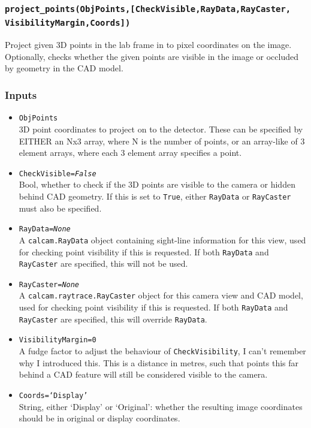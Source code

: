 \documentclass[12pt]{article}
\newcommand{\code}[1]{\texttt{#1}}
\begin{document}
\subsubsection*{\code{project\_points(ObjPoints,[CheckVisible,RayData,RayCaster,\\VisibilityMargin,Coords])}}
\begin{adjustwidth}{0.5cm}{0cm}
Project given 3D points in the lab frame in to pixel coordinates on the image. Optionally, checks whether the given points are visible in the image or occluded by geometry in the CAD model.
\subsubsection*{Inputs}
\begin{itemize}
\item{\code{ObjPoints}\\3D point coordinates to project on to the detector. These can be specified by EITHER an Nx3 array, where N is the number of points, or an array-like of 3 element arrays, where each 3 element array specifies a point.}
\item{\code{CheckVisible={\it False}}\\Bool, whether to check if the 3D points are visible to the camera or hidden behind CAD geometry. If this is set to \code{True}, either \code{RayData} or \code{RayCaster} must also be specified.}
\item{\code{RayData={\it None}}\\A \code{calcam.RayData} object containing sight-line information for this view, used for checking point visibility if this is requested. If both \code{RayData} and \code{RayCaster} are specified, this will not be used.}
\item{\code{RayCaster={\it None}}\\A \code{calcam.raytrace.RayCaster} object for this camera view and CAD model, used for checking point visibility if this is requested. If both \code{RayData} and \code{RayCaster} are specified, this will override \code{RayData}.}
\item{\code{VisibilityMargin=0}\\A fudge factor to adjust the behaviour of \code{CheckVisibility}, I can't remember why I introduced this. This is a distance in metres, such that points this far behind a CAD feature will still be considered visible to the camera.}
\item{\code{Coords=`Display'}\\String, either `Display' or `Original': whether the resulting image coordinates should be in original or display coordinates.}
\end{itemize}

\end{adjustwidth}
\end{document}
